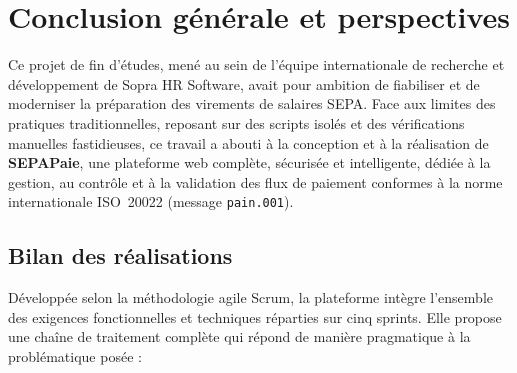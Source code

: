 \chapter*{Conclusion générale et perspectives}

Ce projet de fin d'études, mené au sein de l'équipe internationale de recherche et développement de Sopra HR Software, avait pour ambition de fiabiliser et de moderniser la préparation des virements de salaires SEPA. Face aux limites des pratiques traditionnelles, reposant sur des scripts isolés et des vérifications manuelles fastidieuses, ce travail a abouti à la conception et à la réalisation de \textbf{SEPAPaie}, une plateforme web complète, sécurisée et intelligente, dédiée à la gestion, au contrôle et à la validation des flux de paiement conformes à la norme internationale ISO~20022 (message \texttt{pain.001}).

\section*{Bilan des réalisations}

Développée selon la méthodologie agile Scrum, la plateforme intègre l'ensemble des exigences fonctionnelles et techniques réparties sur cinq sprints. Elle propose une chaîne de traitement complète qui répond de manière pragmatique à la problématique posée :

